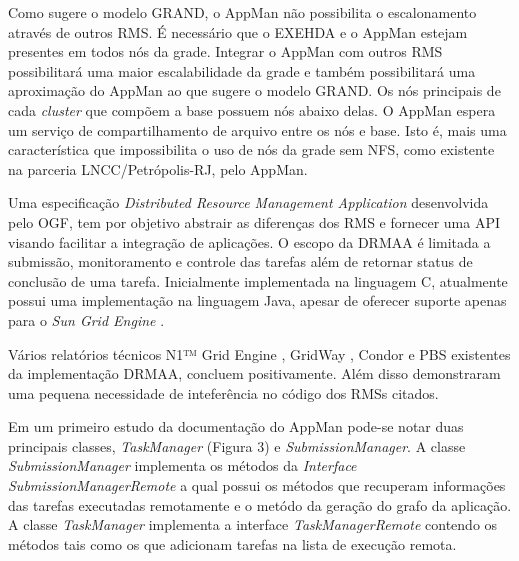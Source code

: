 Como sugere o modelo GRAND, o AppMan não possibilita o escalonamento através de outros RMS. É necessário que o EXEHDA e o AppMan estejam presentes em todos nós da grade. Integrar o AppMan com outros RMS possibilitará uma maior escalabilidade da grade e também possibilitará uma aproximação do AppMan ao que sugere o modelo GRAND. Os nós principais de cada {\it cluster} que compõem a base possuem nós abaixo delas. O AppMan espera um serviço de compartilhamento de arquivo entre os nós e base. Isto é, mais uma característica que impossibilita o uso de nós da grade sem NFS, como existente na parceria LNCC/Petrópolis-RJ, pelo AppMan.

Uma especificação {\it Distributed Resource Management Application} \cite{Rajic2002} desenvolvida pelo OGF, tem por objetivo abstrair as diferenças dos RMS e fornecer uma API visando facilitar a integração de aplicações. O escopo da DRMAA é limitada a submissão, monitoramento e controle das tarefas além de retornar status de conclusão de uma tarefa. Inicialmente implementada na linguagem C, atualmente possui uma implementação na linguagem Java, apesar de oferecer suporte apenas para o {\it Sun Grid Engine} \cite{Templeton}.

Vários relatórios técnicos N1™ Grid Engine \cite{Templeton2006}, GridWay \cite{Herrera2007}, Condor \cite{Troeger2007} e PBS \cite{Ciesnik2007} existentes da implementação DRMAA, concluem positivamente. Além disso demonstraram uma pequena necessidade de inteferência no código dos RMSs citados.

Em um primeiro estudo da documentação do AppMan pode-se notar duas principais classes, {\it TaskManager} (Figura 3) e {\it SubmissionManager}. A classe {\it SubmissionManager} implementa os métodos da {\it Interface SubmissionManagerRemote} a qual possui os métodos que recuperam informações das tarefas executadas remotamente e o metódo da geração do grafo da aplicação. A classe {\it TaskManager } implementa a interface {\it TaskManagerRemote} contendo os métodos tais como os que adicionam tarefas na lista de execução remota.

